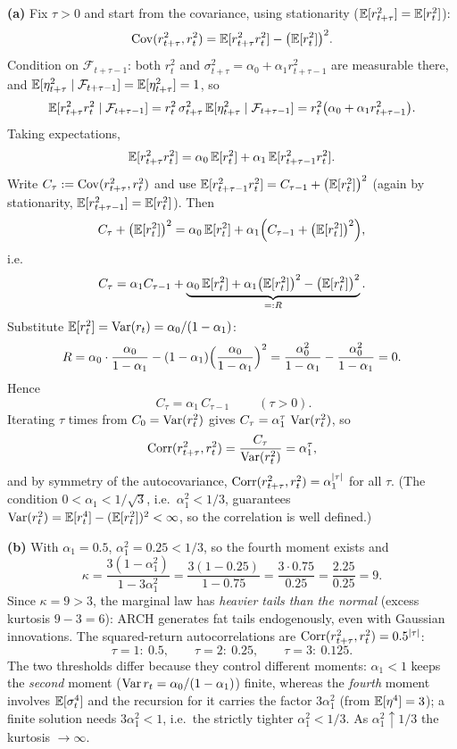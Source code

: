 \documentclass[11pt]{article}
\newcommand{\F}{\mathcal{F}}
\begin{document}
\textbf{(a)} Fix $\tau>0$ and start from the covariance, using stationarity ($\mathbb{E}[r_{t+\tau}^2]=\mathbb{E}[r_t^2]$):
\[
\operatorname{Cov}(r_{t+\tau}^2,r_t^2)=\mathbb{E}[r_{t+\tau}^2 r_t^2]-\bigl(\mathbb{E}[r_t^2]\bigr)^2 .
\]
Condition on $\F_{t+\tau-1}$: both $r_t^2$ and $\sigma_{t+\tau}^2=\alpha_0+\alpha_1 r_{t+\tau-1}^2$ are measurable there, and $\E[\eta_{t+\tau}^2\mid\F_{t+\tau-1}]=\E[\eta_{t+\tau}^2]=1$, so
\[
\E[r_{t+\tau}^2 r_t^2\mid\F_{t+\tau-1}]
=r_t^2\,\sigma_{t+\tau}^2\,\E[\eta_{t+\tau}^2\mid\F_{t+\tau-1}]
=r_t^2\bigl(\alpha_0+\alpha_1 r_{t+\tau-1}^2\bigr).
\]
Taking expectations,
\[
\mathbb{E}[r_{t+\tau}^2 r_t^2]=\alpha_0\,\mathbb{E}[r_t^2]+\alpha_1\,\mathbb{E}[r_{t+\tau-1}^2 r_t^2].
\]
Write $C_\tau:=\operatorname{Cov}(r_{t+\tau}^2,r_t^2)$ and use $\mathbb{E}[r_{t+\tau-1}^2 r_t^2]=C_{\tau-1}+\bigl(\mathbb{E}[r_t^2]\bigr)^2$ (again by stationarity, $\mathbb{E}[r_{t+\tau-1}^2]=\mathbb{E}[r_t^2]$). Then
\[
C_\tau+\bigl(\mathbb{E}[r_t^2]\bigr)^2
=\alpha_0\,\mathbb{E}[r_t^2]+\alpha_1\Bigl(C_{\tau-1}+\bigl(\mathbb{E}[r_t^2]\bigr)^2\Bigr),
\]
i.e.
\[
C_\tau=\alpha_1 C_{\tau-1}
+\underbrace{\alpha_0\,\mathbb{E}[r_t^2]+\alpha_1\bigl(\mathbb{E}[r_t^2]\bigr)^2-\bigl(\mathbb{E}[r_t^2]\bigr)^2}_{=:R}.
\]
Substitute $\mathbb{E}[r_t^2]=\operatorname{Var}(r_t)=\alpha_0/(1-\alpha_1)$:
\[
R=\alpha_0\cdot\frac{\alpha_0}{1-\alpha_1}-(1-\alpha_1)\Bigl(\frac{\alpha_0}{1-\alpha_1}\Bigr)^2
=\frac{\alpha_0^2}{1-\alpha_1}-\frac{\alpha_0^2}{1-\alpha_1}=0 .
\]
Hence
\[
\boxed{\;C_\tau=\alpha_1\,C_{\tau-1}\;}\qquad(\tau>0).
\]
Iterating $\tau$ times from $C_0=\operatorname{Var}(r_t^2)$ gives $C_\tau=\alpha_1^{\tau}\,\operatorname{Var}(r_t^2)$, so
\[
\operatorname{Corr}(r_{t+\tau}^2,r_t^2)=\frac{C_\tau}{\operatorname{Var}(r_t^2)}=\alpha_1^{\tau},
\]
and by symmetry of the autocovariance, $\operatorname{Corr}(r_{t+\tau}^2,r_t^2)=\alpha_1^{\left\lvert \tau \right\rvert}$ for all $\tau$. (The condition $0<\alpha_1<1/\sqrt3$, i.e.\ $\alpha_1^2<1/3$, guarantees $\operatorname{Var}(r_t^2)=\mathbb{E}[r_t^4]-(\mathbb{E}[r_t^2])^2<\infty$, so the correlation is well defined.)

\textbf{(b)} With $\alpha_1=0.5$, $\alpha_1^2=0.25<1/3$, so the fourth moment exists and
\[
\kappa=\frac{3(1-\alpha_1^2)}{1-3\alpha_1^2}
=\frac{3(1-0.25)}{1-0.75}
=\frac{3\cdot0.75}{0.25}
=\frac{2.25}{0.25}=9 .
\]
Since $\kappa=9>3$, the marginal law has \emph{heavier tails than the normal} (excess kurtosis $9-3=6$): ARCH generates fat tails endogenously, even with Gaussian innovations. The squared-return autocorrelations are $\operatorname{Corr}(r_{t+\tau}^2,r_t^2)=0.5^{\left\lvert \tau \right\rvert}$:
\[
\tau=1:\ 0.5,\qquad \tau=2:\ 0.25,\qquad \tau=3:\ 0.125 .
\]
The two thresholds differ because they control different moments: $\alpha_1<1$ keeps the \emph{second} moment ($\operatorname{Var} r_t=\alpha_0/(1-\alpha_1)$) finite, whereas the \emph{fourth} moment involves $\mathbb{E}[\sigma_t^4]$ and the recursion for it carries the factor $3\alpha_1^2$ (from $\mathbb{E}[\eta^4]=3$); a finite solution needs $3\alpha_1^2<1$, i.e.\ the strictly tighter $\alpha_1^2<1/3$. As $\alpha_1^2\uparrow1/3$ the kurtosis $\to\infty$.
\end{document}
